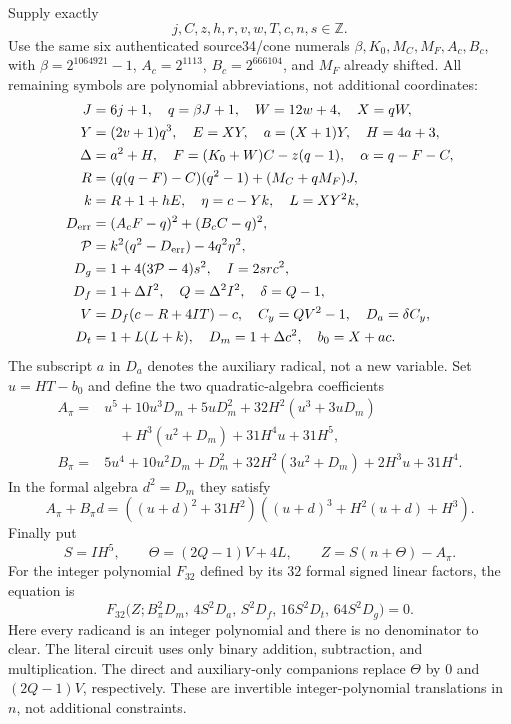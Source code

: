 Supply exactly
\[
 j,C,z,h,r,v,w,T,c,n,s\in\mathbb Z.
\]
Use the same six authenticated source34/cone numerals
$\beta,K_0,M_C,M_F,A_c,B_c$, with
$\beta=2^{1064921}-1$, $A_c=2^{1113}$, $B_c=2^{666104}$, and
$M_F$ already shifted. All remaining symbols are polynomial
abbreviations, not additional coordinates:
\begin{align*}
 J&=6j+1,\quad  q=\beta J+1,\quad  W=12w+4,\quad X=qW,\\
 Y&=(2v+1)q^3,\quad  E=XY,\quad a=(X+1)Y,\quad H=4a+3,\\
 \Delta&=a^2+H,\quad F=(K_0+W)C-z(q-1),\quad \alpha=q-F-C,\\
 R&=(q(q-F)-C)(q^2-1)+(M_C+qM_F)J,\\
 k&=R+1+hE,\quad \eta=c-Yk,\quad L=XY^2k,\\
 D_{\rm err}&=(A_cF-q)^2+(B_cC-q)^2,\\
 \mathcal P&=k^2(q^2-D_{\rm err})-4q^2\eta^2,\\
 D_g&=1+4(3\mathcal P-4)s^2,\quad  I=2src^2,\\
 D_f&=1+\Delta I^2,\quad Q=\Delta^2I^2,\quad \delta=Q-1,\\
 V&=D_f(c-R+4IT)-c,\quad C_y=QV^2-1,\quad D_a=\delta C_y,\\
 D_t&=1+L(L+k),\quad D_m=1+\Delta c^2,\quad b_0=X+ac.
\end{align*}
The subscript $a$ in $D_a$ denotes the auxiliary radical, not a new
variable. Set $u=HT-b_0$ and define the two quadratic-algebra coefficients
\begin{align*}
 A_\pi={}&u^5+10u^3D_m+5uD_m^2
       +32H^2(u^3+3uD_m)\\
       &\quad+H^3(u^2+D_m)+31H^4u+31H^5,\\
 B_\pi={}&5u^4+10u^2D_m+D_m^2
       +32H^2(3u^2+D_m)+2H^3u+31H^4.
\end{align*}
In the formal algebra $d^2=D_m$ they satisfy
\[
 A_\pi+B_\pi d
 =((u+d)^2+31H^2)((u+d)^3+H^2(u+d)+H^3).
\]
Finally put
\[
 S=IH^5,\qquad \Theta=(2Q-1)V+4L,\qquad
 Z=S(n+\Theta)-A_\pi.
\]
For the integer polynomial $F_{32}$ defined by its $32$ formal signed
linear factors, the equation is
\begin{equation}
\label{eq:eleven-parity-norm}
 F_{32}\bigl(Z;
 B_\pi^2D_m,\,4S^2D_a,\,S^2D_f,\,16S^2D_t,\,64S^2D_g\bigr)=0.
\end{equation}
Here every radicand is an integer polynomial and there is no denominator
to clear. The literal circuit uses only binary addition, subtraction,
and multiplication. The direct and auxiliary-only companions replace
$\Theta$ by $0$ and $(2Q-1)V$, respectively. These are invertible
integer-polynomial translations in $n$, not additional constraints.

